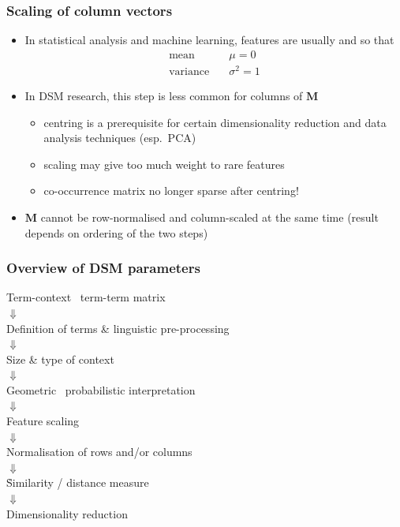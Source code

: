 \documentclass[t]{beamer} %
\begin{document}
\begin{frame}
  \frametitle{Scaling of column vectors}

  \begin{itemize}
  \item In statistical analysis and machine learning, features are
    usually  and  so that
    \begin{align*}
      \text{mean} & \quad \mu = 0 \\
      \text{variance} & \quad \sigma^2 = 1
    \end{align*}
  \item In DSM research, this step is less common for columns of $\mathbf{M}$
    \begin{itemize}
    \item centring is a prerequisite for certain dimensionality
      reduction and data analysis techniques (esp.\ PCA)
    \item scaling may give too much weight to rare features
    \item co-occurrence matrix no longer sparse after centring!
    \end{itemize}
    \pause
  \item $\mathbf{M}$ cannot be row-normalised and column-scaled at the
    same time (result depends on ordering of the two steps)
  \end{itemize}
\end{frame}

\begin{frame}
  \frametitle{Overview of DSM parameters}

  \ungap[1]
  \begin{center}
    Term-context \vs\ term-term matrix\\
    $\Downarrow$\\
    Definition of terms \& linguistic pre-processing\\
    $\Downarrow$\\
    Size \& type of context\\
    $\Downarrow$\\
    Geometric \vs\ probabilistic interpretation\\
    $\Downarrow$\\
    Feature scaling\\
    $\Downarrow$\\
    Normalisation of rows and/or columns\\
    $\Downarrow$\\
    \h{Similarity / distance measure}\\
    $\Downarrow$\\
    Dimensionality reduction
  \end{center}
\end{frame}
\end{document}
